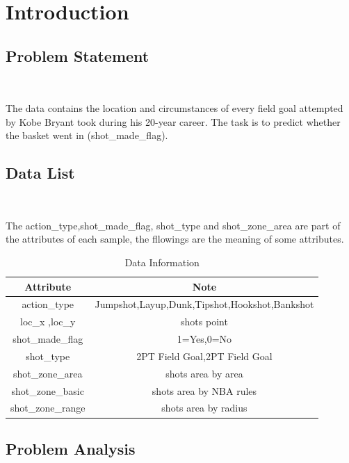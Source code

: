
\section{Introduction}\label{sec-intro}

\subsection{Problem Statement}
\

The data contains the location and circumstances of every field goal 
attempted by Kobe Bryant took during his 20-year career. The task is to predict 
whether the basket went in (shot_made_flag).




\subsection{Data List}
\

The action_type,shot_made_flag,  
shot_type and shot_zone_area are part of the attributes of each sample,
the fllowings are the meaning of some attributes.

		\begin{table}[htbp]
	\centering
	\begin{tabular}{cc}
		\toprule  %
		Attribute& Note\\
		\hline
		action_type & Jumpshot,Layup,Dunk,Tipshot,Hookshot,Bankshot\\
		loc_x ,loc_y & shots point\\
		shot_made_flag & 1=Yes,0=No\\
		shot_type & 2PT Field Goal,2PT Field Goal\\
		shot_zone_area & shots area by area\\
		shot_zone_basic & shots area by  NBA rules\\
		shot_zone_range & shots area by radius\\
		
		\bottomrule %
	\end{tabular}
	\bigskip
	\caption{Data Information}
\end{table}
\label{table1}



\subsection{Problem Analysis}

